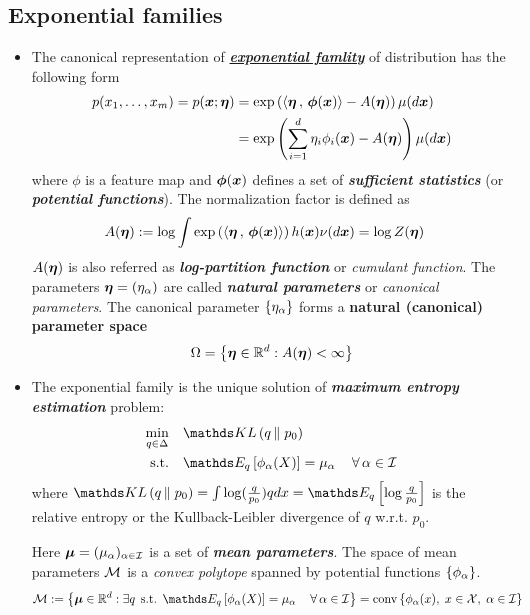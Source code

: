 \documentclass[11pt]{article}
\begin{document}
\subsection{Exponential families}
\begin{itemize}
\item The canonical representation of \underline{\emph{\textbf{exponential famlity}}} of distribution has the following form
\begin{align}
p(x_1, \ldots, x_{m}) = p(\boldsymbol{x}; \boldsymbol{\eta}) &= \exp\left(\left\langle \boldsymbol{\eta}\,,\, \boldsymbol{\phi}(\boldsymbol{x}) \right\rangle - A(\boldsymbol{\eta})\right)\mu(d\boldsymbol{x}) \nonumber \\
&= \exp\left(\sum_{i=1}^{d}\eta_{i}\phi_{i}(\boldsymbol{x}) -  A(\boldsymbol{\eta})\right)\mu(d\boldsymbol{x}) \label{eqn: exp_fam}
\end{align} where $\phi$ is a feature map  and $\boldsymbol{\phi}(\boldsymbol{x})$ defines a set of \emph{\textbf{sufficient statistics}} (or \emph{\textbf{potential functions}}). The normalization factor is defined as
\begin{align*}
 A(\boldsymbol{\eta}) &:= \log \int \exp\left( \left\langle \boldsymbol{\eta}\,,\, \boldsymbol{\phi}(\boldsymbol{x}) \right\rangle \right)h(\boldsymbol{x})\nu(d\boldsymbol{x}) = \log Z(\boldsymbol{\eta})
\end{align*} $A(\boldsymbol{\eta})$ is also referred as \textbf{\emph{log-partition function}} or \emph{cumulant function}. The parameters $\boldsymbol{\eta} = (\eta_{\alpha})$ are called \textbf{\emph{natural parameters}}  or \emph{canonical parameters}. The canonical parameter $\left\{\eta_{\alpha}\right\}$ forms a \textbf{natural (canonical) parameter space}
\begin{align}
\Omega = \left\{\boldsymbol{\eta} \in {\mathbb R}^{d}: A(\boldsymbol{\eta}) < \infty\right\} \label{eqn: canonical_space}
\end{align}

\item The exponential family is the unique solution of \textbf{\emph{maximum entropy estimation}} problem:
\begin{align}
\min_{q \in \Delta}&\quad \kl{q}{p_{0}} \label{eqn: max_ent}\\
\text{s.t.}&\quad \E{q}{\phi_{\alpha}(X)} = \mu_{\alpha}\,\quad  \forall\, \alpha \in \cI   \label{eqn: max_ent_mean_constraint}
\end{align} where $\kl{q}{p_0} = \int \log(\frac{q}{p_0}) q dx = \E{q}{\log\frac{q}{p_0}}$ is the relative entropy or the Kullback-Leibler divergence of $q$ w.r.t. $p_0$.

Here $\boldsymbol{\mu} = (\mu_{\alpha})_{\alpha \in {\mathcal I}}$ is a set of  \textbf{\emph{mean parameters}}. The space of mean parameters ${\mathcal M}$ is a \emph{convex polytope} spanned by potential functions $\left\{\phi_{\alpha}\right\}$.
\begin{align}
\cM &:= \set{\mb{\mu} \in \bR^d: \exists q\,\; \text{s.t. } \E{q}{\phi_{\alpha}(X)} = \mu_{\alpha}\,\quad  \forall\, \alpha \in \cI} = \text{conv}\set{\phi_{\alpha}(x),\; x\in \cX, \;\alpha \in \cI}  \label{eqn: marginal_polytope}
\end{align}


\end{itemize}
\end{document}
